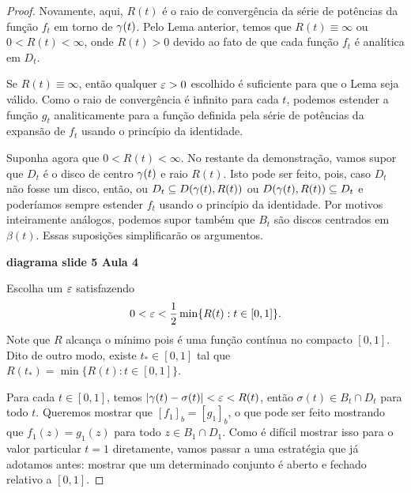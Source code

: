     \begin{proof}
        Novamente, aqui, $R(t)$ é o raio de convergência da série de potências da função 
        $f_t$ em torno de $\gamma(t)$. Pelo Lema anterior, temos que $R(t) \equiv \infty$ 
        ou $0 < R(t) < \infty$, onde $R(t) > 0$ devido ao fato de que cada função $f_t$ é
        analítica em $D_t$. 
        
        Se $R(t) \equiv \infty$, então qualquer $\varepsilon > 0$ escolhido é suficiente 
        para que o Lema seja válido. Como o raio de convergência é infinito para cada $t$,
        podemos estender a função $g_t$ analiticamente para a função definida pela série de
        potências da expansão de $f_t$ usando o princípio da identidade.
        
        Suponha agora que $0 < R(t) < \infty$. No restante da demonstração, vamos supor que 
        $D_t$ é o disco de centro $\gamma(t)$ e raio $R(t)$. Isto pode ser feito, pois, caso
        $D_t$ não fosse um disco, então, ou $D_t \subseteq D(\gamma(t),R(t))$ ou
        $D(\gamma(t),R(t)) \subseteq D_t$ e poderíamos sempre estender $f_t$ usando o 
        princípio da identidade. Por motivos inteiramente análogos, podemos supor também
        que $B_t$ são discos centrados em $\beta(t)$. Essas suposições simplificarão 
        os argumentos.
        \begin{center}
            \textbf{diagrama slide 5 Aula 4}
        \end{center}
        Escolha um $\varepsilon$ satisfazendo
        \begin{equation*}
        0 < \varepsilon < \frac{1}{2}\min\{R(t): t \in [0,1]\}.
        \end{equation*}
        Note que $R$ alcança o mínimo pois é uma função contínua no compacto $[0,1]$. 
        Dito de outro modo, existe $t_* \in [0,1]$ tal que $R(t_*) = \min\{R(t): t \in [0,1]\}$.
        
        Para cada $t \in [0,1]$, temos $|\gamma(t) - \sigma(t)| < \varepsilon < R(t)$, então
        $\sigma(t) \in B_t \cap D_t$ para todo $t$. Queremos mostrar que $[f_1]_b = [g_1]_b$, 
        o que pode ser feito mostrando que $f_1(z) = g_1(z)$ para todo $z \in B_1 \cap D_1$. 
        Como é difícil mostrar isso para o valor particular $t=1$ diretamente, vamos passar 
        a uma estratégia que já adotamos antes: mostrar que um determinado conjunto é aberto
        e fechado relativo a $[0,1]$.
        

\end{proof}
